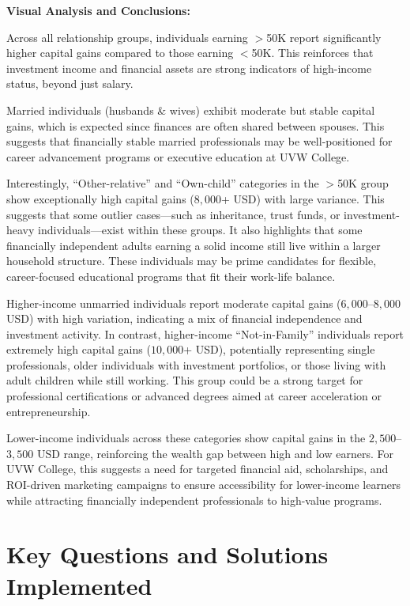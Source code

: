 \documentclass[journal,onecolumn]{IEEEtran}
\begin{document}
\medskip
\textbf{Visual Analysis and Conclusions:} 

Across all relationship groups, individuals earning $>$50K report significantly
higher capital gains compared to those earning $<$50K. This reinforces that
investment income and financial assets are strong indicators of high-income status, beyond just salary.

Married individuals (husbands \& wives) exhibit moderate but stable capital
gains, which is expected since finances are often shared between spouses.
This suggests that financially stable married professionals may be
well-positioned for career advancement programs or executive education at UVW College.

Interestingly, “Other-relative” and “Own-child” categories in the $>$50K
group show exceptionally high capital gains ($8,000$+ USD) with large variance.
This suggests that some outlier cases—such as inheritance, trust funds, 
or investment-heavy individuals—exist within these groups. It also 
highlights that some financially independent adults earning a solid 
income still live within a larger household structure. These individuals
may be prime candidates for flexible, career-focused educational programs that fit their work-life balance.

Higher-income unmarried individuals report moderate capital gains ($6,000$–$8,000$ USD)
with high variation, indicating a mix of financial independence and investment activity.
In contrast, higher-income “Not-in-Family” individuals report extremely high capital gains ($10,000$+ USD),
potentially representing single professionals, older individuals with investment portfolios,
or those living with adult children while still working. This group could be a strong target
for professional certifications or advanced degrees aimed at career acceleration or entrepreneurship.

Lower-income individuals across these categories show capital gains in the $2,500$–$3,500$ USD
range, reinforcing the wealth gap between high and low earners. For UVW College,
this suggests a need for targeted financial aid, scholarships, and ROI-driven marketing
campaigns to ensure accessibility for lower-income learners while attracting financially
independent professionals to high-value programs.


\section{Key Questions and Solutions Implemented}
\end{document}
